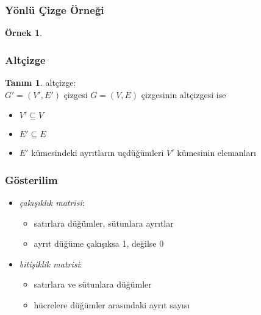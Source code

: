 \documentclass[dvipsnames]{beamer}
\theoremstyle{definition}
\newtheorem{tanim}[theorem]{Tanım}
\theoremstyle{example}
\newtheorem{ornek}[theorem]{Örnek}
\theoremstyle{plain}
\begin{document}
\begin{frame}
  \frametitle{Yönlü Çizge Örneği}

  \begin{ornek}
    \begin{center}
    \end{center}
  \end{ornek}
\end{frame}

\begin{frame}
  \frametitle{Altçizge}

  \begin{tanim}
    \alert{altçizge}:\\
      $G'=(V',E')$ çizgesi $G=(V,E)$ çizgesinin altçizgesi ise

    \begin{itemize}
      \item $V' \subseteq V$
      \item $E' \subseteq E$
      \item $E'$ kümesindeki ayrıtların uçdüğümleri $V'$ kümesinin elemanları
    \end{itemize}
  \end{tanim}
\end{frame}

\begin{frame}
  \frametitle{Gösterilim}

  \begin{itemize}
    \item \emph{çakışıklık matrisi}:
    \begin{itemize}
      \item satırlara düğümler, sütunlara ayrıtlar
      \item ayrıt düğüme çakışıksa 1, değilse 0
    \end{itemize}

    \pause
    \medskip
    \item \emph{bitişiklik matrisi}:
    \begin{itemize}
      \item satırlara ve sütunlara düğümler
      \item hücrelere düğümler arasındaki ayrıt sayısı
    \end{itemize}
  \end{itemize}
\end{frame}
\end{document}
